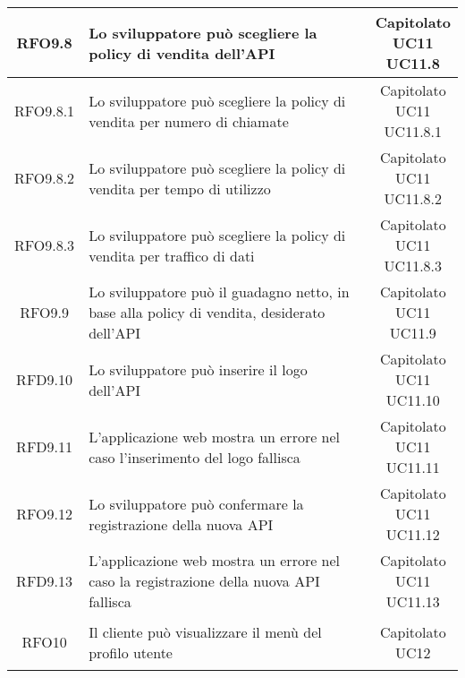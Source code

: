 \begin{longtable}{|c|p{8cm}|c|}
\hypertarget{RFO9.8}{RFO9.8} & Lo sviluppatore può scegliere la policy di vendita dell'API & \makecell*{Capitolato\\UC11\\UC11.8} \\
\hline

\hypertarget{RFO9.8.1}{RFO9.8.1} & Lo sviluppatore può scegliere la policy di vendita per numero di chiamate & \makecell*{Capitolato\\UC11\\UC11.8.1} \\
\hline
\hypertarget{RFO9.8.2}{RFO9.8.2} & Lo sviluppatore può scegliere la policy di vendita per tempo di utilizzo & \makecell*{Capitolato\\UC11\\UC11.8.2} \\
\hline
\hypertarget{RFO9.8.3}{RFO9.8.3} & Lo sviluppatore può scegliere la policy di vendita per traffico di dati & \makecell*{Capitolato\\UC11\\UC11.8.3} \\
\hline

\hypertarget{RFO9.9}{RFO9.9} & Lo sviluppatore può il guadagno netto, in base alla policy di vendita, desiderato dell'API & \makecell*{Capitolato\\UC11\\UC11.9} \\
\hline
\hypertarget{RFD9.10}{RFD9.10} & Lo sviluppatore può inserire il logo dell'API & \makecell*{Capitolato\\UC11\\UC11.10} \\
\hline
\hypertarget{RFD9.11}{RFD9.11} & L'applicazione web mostra un errore nel caso l'inserimento del logo fallisca & \makecell*{Capitolato\\UC11\\UC11.11} \\
\hline
\hypertarget{RFO9.12}{RFO9.12} & Lo sviluppatore può confermare la registrazione della nuova API & \makecell*{Capitolato\\UC11\\UC11.12} \\
\hline
\hypertarget{RFD9.13}{RFD9.13} & L'applicazione web mostra un errore nel caso la registrazione della nuova API fallisca & \makecell*{Capitolato\\UC11\\UC11.13} \\
\hline

\hypertarget{RFO10}{RFO10} & Il cliente può visualizzare il menù del profilo utente & \makecell*{Capitolato\\UC12} \\
\hline


\end{longtable}
